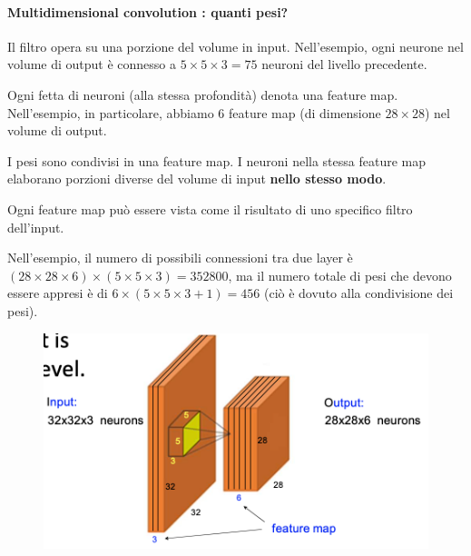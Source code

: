 \paragraph{Multidimensional convolution : quanti pesi?} 
Il filtro opera su una porzione del volume in input. Nell'esempio, ogni neurone nel volume di output è connesso a $5\times5\times3=75$ neuroni del livello precedente.


Ogni fetta di neuroni (alla stessa profondità) denota una feature map. Nell'esempio, in particolare, abbiamo $6$ feature map (di dimensione $28\times28$) nel volume di output. 



I pesi sono condivisi in una feature map. I neuroni nella stessa feature map elaborano porzioni diverse del volume di input \textbf{nello stesso modo}.



Ogni feature map può essere vista come il risultato di uno specifico filtro dell'input.


Nell'esempio, il numero di possibili connessioni tra due layer è $(28\times28\times6)\times(5\times5\times3)=352800$, ma il numero totale di pesi che devono essere appresi è di $6\times(5\times5\times3+1)=456$ (ciò è dovuto alla condivisione dei pesi).
\begin{figure}[!h]
    \includegraphics[scale=.5]{images/cnn/weights.png}
    \centering
\end{figure}
\newpage
